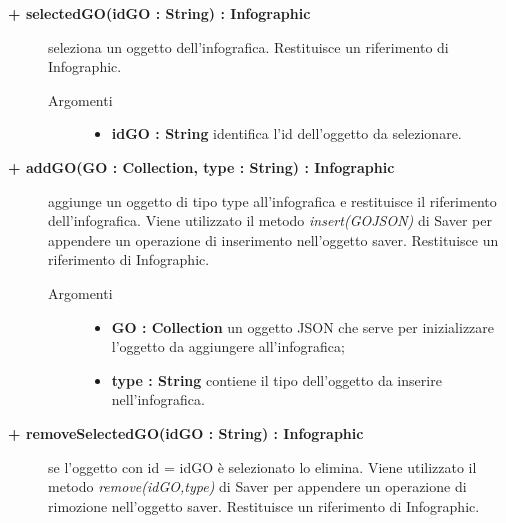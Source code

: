 \begin{description}
\begin{description}
		\item[\textbf{\color{blue}+ selectedGO(idGO : String) : Infographic			}] \hfill
			seleziona un oggetto dell'infografica. Restituisce un riferimento di Infographic.

		\begin{description}
			\item[Argomenti] \hfill
				\begin{itemize}
				
					\item \textbf{idGO : String			} \hfill
					identifica l'id dell'oggetto da selezionare.
				\end{itemize}
		\end{description}

\end{description}

\begin{description}
		\item[\textbf{\color{blue}+ addGO(GO : Collection, type : String) : Infographic			}] \hfill
			aggiunge un oggetto di tipo type all'infografica e restituisce il riferimento dell'infografica. Viene utilizzato il metodo \textit{insert(GOJSON)} di Saver per appendere un operazione di inserimento nell'oggetto saver. Restituisce un riferimento di Infographic. 

\begin{description}
			\item[Argomenti] \hfill
				\begin{itemize}
						\item \textbf{GO : Collection			} \hfill
					un oggetto JSON che serve per inizializzare l'oggetto da aggiungere all'infografica;
					  	\item \textbf{type : String			} \hfill
					  	contiene il tipo dell'oggetto da inserire nell'infografica.
				\end{itemize}

\end{description}

\end{description}


\begin{description}
		\item[\textbf{\color{blue}+ removeSelectedGO(idGO : String) : Infographic			}] \hfill
			se l'oggetto con id = idGO è selezionato lo elimina. Viene utilizzato il metodo \textit{remove(idGO,type)} di Saver per appendere un operazione di rimozione nell'oggetto saver. Restituisce un riferimento di Infographic.


\end{description}
\end{description}
